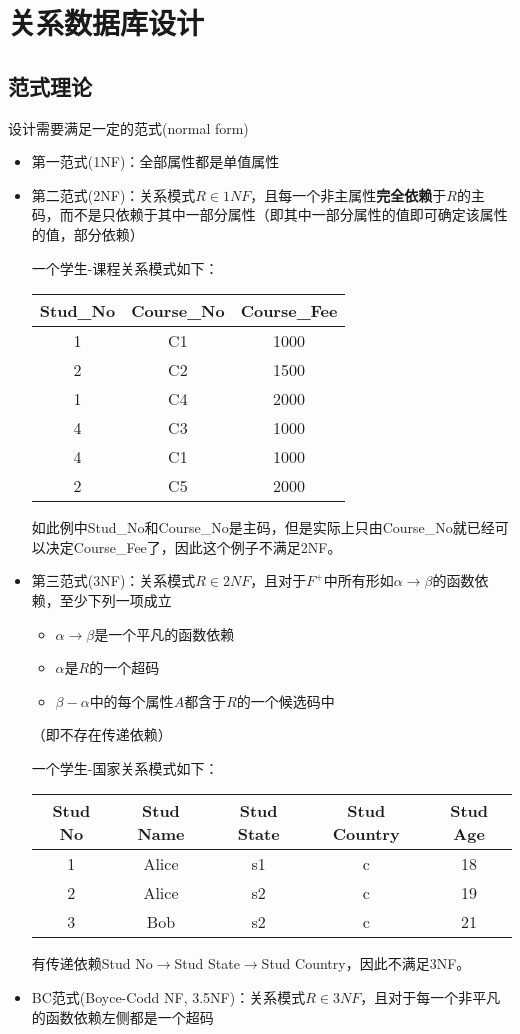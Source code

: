 
\section{关系数据库设计} %
\subsection{范式理论}
设计需要满足一定的范式(normal form)
\begin{itemize}
	\item 第一范式(1NF)：全部属性都是单值属性

	\item 第二范式(2NF)：关系模式$R\in 1NF$，且每一个非主属性\textbf{完全依赖}于$R$的主码，而不是只依赖于其中一部分属性（即其中一部分属性的值即可确定该属性的值，部分依赖）
	\begin{example}
	一个学生-课程关系模式如下：
	\begin{center}
	\begin{tabular}{|c|c|c|}\hline
		Stud\_No & Course\_No & Course\_Fee\\\hline
		1 & C1 & 1000\\
		2 & C2 & 1500\\
		1 & C4 & 2000\\
		4 & C3 & 1000\\
		4 & C1 & 1000\\
		2 & C5 & 2000\\\hline
	\end{tabular}
	\end{center}
	如此例中Stud\_No和Course\_No是主码，但是实际上只由Course\_No就已经可以决定Course\_Fee了，因此这个例子不满足2NF。
	\end{example}

	\item 第三范式(3NF)：关系模式$R\in 2NF$，且对于$F^+$中所有形如$\alpha\to\beta$的函数依赖，至少下列一项成立
	\begin{itemize}
		\item $\alpha\to\beta$是一个平凡的函数依赖
		\item $\alpha$是$R$的一个超码
		\item $\beta-\alpha$中的每个属性$A$都含于$R$的一个候选码中
	\end{itemize}
	（即不存在传递依赖）
	\begin{example}
	一个学生-国家关系模式如下：
	\begin{tabular}{ccccc}\hline
	Stud No & Stud Name & Stud State & Stud Country & Stud Age\\\hline
	1 & Alice & s1 & c & 18\\
	2 & Alice & s2 & c & 19\\
	3 & Bob & s2 & c & 21\\\hline
	\end{tabular}
	有传递依赖Stud No$\to$Stud State$\to$Stud Country，因此不满足3NF。
	\end{example}

	\item BC范式(Boyce-Codd NF, 3.5NF)：关系模式$R\in 3NF$，且对于每一个非平凡的函数依赖左侧都是一个超码
\end{itemize}


